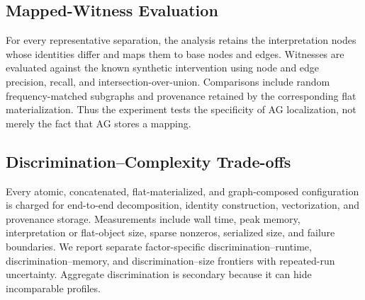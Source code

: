 \subsection{Mapped-Witness Evaluation}

For every representative separation, the analysis retains the interpretation
nodes whose identities differ and maps them to base nodes and edges. Witnesses
are evaluated against the known synthetic intervention using node and edge
precision, recall, and intersection-over-union. Comparisons include random
frequency-matched subgraphs and provenance retained by the corresponding flat
materialization. Thus the experiment tests the specificity of AG localization,
not merely the fact that AG stores a mapping.

\subsection{Discrimination--Complexity Trade-offs}

Every atomic, concatenated, flat-materialized, and graph-composed configuration
is charged for end-to-end decomposition, identity construction, vectorization,
and provenance storage. Measurements include wall time, peak memory,
interpretation or flat-object size, sparse nonzeros, serialized size, and
failure boundaries. We report separate factor-specific
discrimination--runtime, discrimination--memory, and discrimination--size
frontiers with repeated-run uncertainty. Aggregate discrimination is secondary
because it can hide incomparable profiles.
